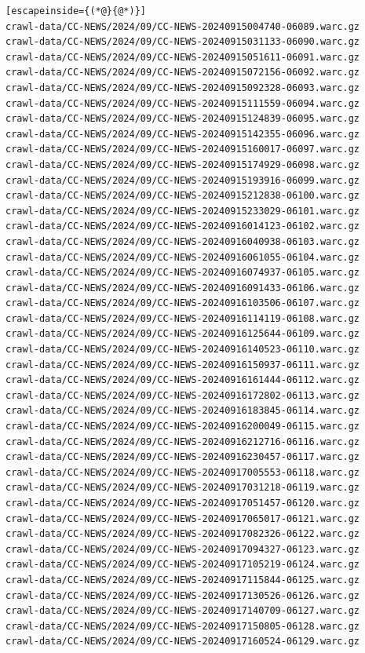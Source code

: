 \begin{lstlisting}[escapeinside={(*@}{@*)}]
crawl-data/CC-NEWS/2024/09/CC-NEWS-20240915004740-06089.warc.gz
crawl-data/CC-NEWS/2024/09/CC-NEWS-20240915031133-06090.warc.gz
crawl-data/CC-NEWS/2024/09/CC-NEWS-20240915051611-06091.warc.gz
crawl-data/CC-NEWS/2024/09/CC-NEWS-20240915072156-06092.warc.gz
crawl-data/CC-NEWS/2024/09/CC-NEWS-20240915092328-06093.warc.gz
crawl-data/CC-NEWS/2024/09/CC-NEWS-20240915111559-06094.warc.gz
crawl-data/CC-NEWS/2024/09/CC-NEWS-20240915124839-06095.warc.gz
crawl-data/CC-NEWS/2024/09/CC-NEWS-20240915142355-06096.warc.gz
crawl-data/CC-NEWS/2024/09/CC-NEWS-20240915160017-06097.warc.gz
crawl-data/CC-NEWS/2024/09/CC-NEWS-20240915174929-06098.warc.gz
crawl-data/CC-NEWS/2024/09/CC-NEWS-20240915193916-06099.warc.gz
crawl-data/CC-NEWS/2024/09/CC-NEWS-20240915212838-06100.warc.gz
crawl-data/CC-NEWS/2024/09/CC-NEWS-20240915233029-06101.warc.gz
crawl-data/CC-NEWS/2024/09/CC-NEWS-20240916014123-06102.warc.gz
crawl-data/CC-NEWS/2024/09/CC-NEWS-20240916040938-06103.warc.gz
crawl-data/CC-NEWS/2024/09/CC-NEWS-20240916061055-06104.warc.gz
crawl-data/CC-NEWS/2024/09/CC-NEWS-20240916074937-06105.warc.gz
crawl-data/CC-NEWS/2024/09/CC-NEWS-20240916091433-06106.warc.gz
crawl-data/CC-NEWS/2024/09/CC-NEWS-20240916103506-06107.warc.gz
crawl-data/CC-NEWS/2024/09/CC-NEWS-20240916114119-06108.warc.gz
crawl-data/CC-NEWS/2024/09/CC-NEWS-20240916125644-06109.warc.gz
crawl-data/CC-NEWS/2024/09/CC-NEWS-20240916140523-06110.warc.gz
crawl-data/CC-NEWS/2024/09/CC-NEWS-20240916150937-06111.warc.gz
crawl-data/CC-NEWS/2024/09/CC-NEWS-20240916161444-06112.warc.gz
crawl-data/CC-NEWS/2024/09/CC-NEWS-20240916172802-06113.warc.gz
crawl-data/CC-NEWS/2024/09/CC-NEWS-20240916183845-06114.warc.gz
crawl-data/CC-NEWS/2024/09/CC-NEWS-20240916200049-06115.warc.gz
crawl-data/CC-NEWS/2024/09/CC-NEWS-20240916212716-06116.warc.gz
crawl-data/CC-NEWS/2024/09/CC-NEWS-20240916230457-06117.warc.gz
crawl-data/CC-NEWS/2024/09/CC-NEWS-20240917005553-06118.warc.gz
crawl-data/CC-NEWS/2024/09/CC-NEWS-20240917031218-06119.warc.gz
crawl-data/CC-NEWS/2024/09/CC-NEWS-20240917051457-06120.warc.gz
crawl-data/CC-NEWS/2024/09/CC-NEWS-20240917065017-06121.warc.gz
crawl-data/CC-NEWS/2024/09/CC-NEWS-20240917082326-06122.warc.gz
crawl-data/CC-NEWS/2024/09/CC-NEWS-20240917094327-06123.warc.gz
crawl-data/CC-NEWS/2024/09/CC-NEWS-20240917105219-06124.warc.gz
crawl-data/CC-NEWS/2024/09/CC-NEWS-20240917115844-06125.warc.gz
crawl-data/CC-NEWS/2024/09/CC-NEWS-20240917130526-06126.warc.gz
crawl-data/CC-NEWS/2024/09/CC-NEWS-20240917140709-06127.warc.gz
crawl-data/CC-NEWS/2024/09/CC-NEWS-20240917150805-06128.warc.gz
crawl-data/CC-NEWS/2024/09/CC-NEWS-20240917160524-06129.warc.gz

\end{lstlisting}
